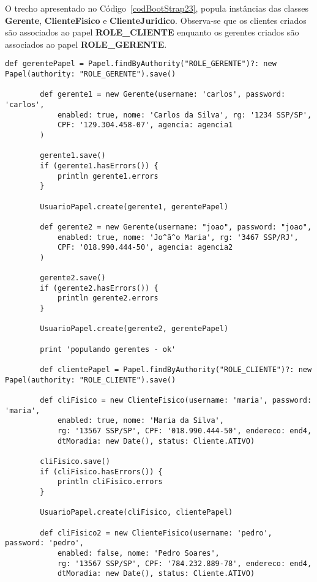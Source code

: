 \newpage

O  trecho  apresentado  no  Código~\ref{codBootStrap23}, popula  instâncias  das
classes {\bf  Gerente}, {\bf ClienteFisico} e  {\bf ClienteJuridico}. Observa-se
que os clientes criados são  associados ao papel {\bf ROLE\_CLIENTE} enquanto os
gerentes criados são associados ao papel {\bf ROLE\_GERENTE}. 

\begin{lstlisting}[caption={\bf BootStrap.groovy (3)}, frame = trBL, float=htbp,
    label=codBootStrap23] 
        def gerentePapel = Papel.findByAuthority("ROLE_GERENTE")?: new Papel(authority: "ROLE_GERENTE").save()

        def gerente1 = new Gerente(username: 'carlos', password: 'carlos',
            enabled: true, nome: 'Carlos da Silva', rg: '1234 SSP/SP',
            CPF: '129.304.458-07', agencia: agencia1
        )    

        gerente1.save()
        if (gerente1.hasErrors()) {
            println gerente1.errors
        }

        UsuarioPapel.create(gerente1, gerentePapel)
        
        def gerente2 = new Gerente(username: "joao", password: "joao",
            enabled: true, nome: 'Jo^ã^o Maria', rg: '3467 SSP/RJ',            
            CPF: '018.990.444-50', agencia: agencia2
        )

        gerente2.save()
        if (gerente2.hasErrors()) {
            println gerente2.errors
        }

        UsuarioPapel.create(gerente2, gerentePapel)
        
        print 'populando gerentes - ok'
        
        def clientePapel = Papel.findByAuthority("ROLE_CLIENTE")?: new Papel(authority: "ROLE_CLIENTE").save()

        def cliFisico = new ClienteFisico(username: 'maria', password: 'maria',
            enabled: true, nome: 'Maria da Silva', 
            rg: '13567 SSP/SP', CPF: '018.990.444-50', endereco: end4,
            dtMoradia: new Date(), status: Cliente.ATIVO) 

        cliFisico.save()
        if (cliFisico.hasErrors()) {
            println cliFisico.errors
        }

        UsuarioPapel.create(cliFisico, clientePapel)
        
        def cliFisico2 = new ClienteFisico(username: 'pedro', password: 'pedro',
            enabled: false, nome: 'Pedro Soares', 
            rg: '13567 SSP/SP', CPF: '784.232.889-78', endereco: end4,
            dtMoradia: new Date(), status: Cliente.ATIVO) 


\end{lstlisting}
